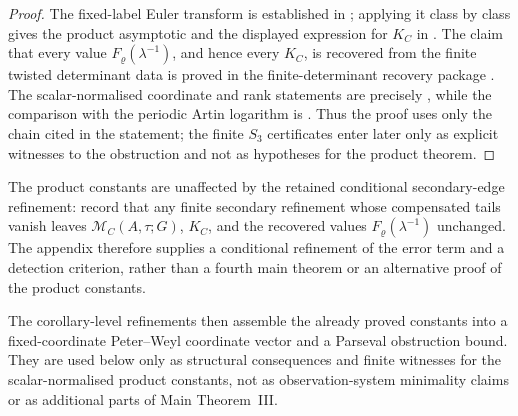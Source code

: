\begin{proof}
  The fixed-label Euler transform is established in
  ; applying it class by class gives the
  product asymptotic and the displayed expression for \(K_C\) in
  .  The claim that every value
  \(F_\varrho(\lambda^{-1})\), and hence every \(K_C\), is recovered from the
  finite twisted determinant data is proved in the finite-determinant recovery
  package
  .
  The scalar-normalised coordinate and rank statements are precisely
  , while the comparison
  with the periodic Artin logarithm is
  .
  Thus the proof uses only the chain cited in the statement; the finite
  \(S_3\) certificates enter later only as explicit witnesses to the
  obstruction and not as hypotheses for the product theorem.
\end{proof}

The product constants are unaffected by the retained conditional
secondary-edge refinement:
record that any finite secondary refinement whose compensated tails vanish leaves
\(\mathcal M_C(A,\tau;G)\), \(K_C\), and the recovered values
\(F_\varrho(\lambda^{-1})\) unchanged.  The appendix therefore supplies a
conditional refinement of the error term and a detection criterion, rather than
a fourth main theorem or an alternative proof of the product constants.

The corollary-level refinements
then assemble the already proved constants into a fixed-coordinate
Peter--Weyl coordinate vector and a Parseval obstruction bound.  They are used below
only as structural consequences and finite witnesses for the
scalar-normalised product constants, not as observation-system minimality
claims or as additional parts of Main Theorem~III.


